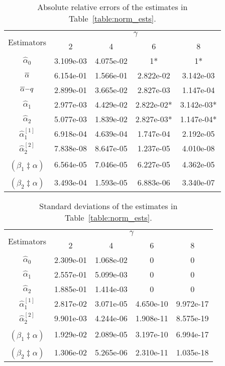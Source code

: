 \begin{table}[H]
\centering
\begin{tabular}{ccccc}
\toprule
\multirow{2}{*}{Estimators} & \multicolumn{4}{c}{$\gamma$} \\
                            & 2    & 4    & 6    & 8    \\
\midrule
$\hat{\alpha}_0$ & 3.109e-03 & 4.075e-02 & 1* & 1* \\
\rowcolor{Gray} $\overline{\alpha}$ & 6.154e-01 & 1.566e-01 & 2.822e-02 & 3.142e-03 \\
$\overline{\alpha}{-}q$ & 2.899e-01 & 3.665e-02 & 2.827e-03 & 1.147e-04 \\
\rowcolor{Gray} $\hat{\alpha}_1$ & 2.977e-03 & 4.429e-02 & 2.822e-02* & 3.142e-03* \\
$\hat{\alpha}_2$ & 5.077e-03 & 1.839e-02 & 2.827e-03* & 1.147e-04* \\
\rowcolor{Gray} $\hat{\alpha}_1^{[1]}$ & 6.918e-04 & 4.639e-04 & 1.747e-04 & 2.192e-05 \\
$\hat{\alpha}_2^{[2]}$ & 7.838e-08 & 8.647e-05 & 1.237e-05 & 4.010e-08 \\
\rowcolor{Gray} $\widehat{(\beta_1 \ddagger \alpha)}$ & 6.564e-05 & 7.046e-05 & 6.227e-05 & 4.362e-05 \\
$\widehat{(\beta_2 \ddagger \alpha)}$ & 3.493e-04 & 1.593e-05 & 6.883e-06 & 3.340e-07 \\
\bottomrule
\end{tabular}
\caption{Absolute relative errors of the estimates in Table~\ref{table:norm_ests}.}
\end{table}

\vspace{-2em}

\begin{table}[H]
\centering
\begin{tabular}{ccccc}
\toprule
\multirow{2}{*}{Estimators} & \multicolumn{4}{c}{$\gamma$} \\
                            & 2    & 4    & 6    & 8    \\
\midrule
$\hat{\alpha}_0$ & 2.309e-01 & 1.068e-02 & 0 & 0 \\
\rowcolor{Gray} $\hat{\alpha}_1$ & 2.557e-01 & 5.099e-03 & 0 & 0 \\
$\hat{\alpha}_2$ & 1.885e-01 & 1.414e-03 & 0 & 0 \\
\rowcolor{Gray} $\hat{\alpha}_1^{[1]}$ & 2.817e-02 & 3.071e-05 & 4.650e-10 & 9.972e-17 \\
$\hat{\alpha}_2^{[2]}$ & 9.901e-03 & 4.244e-06 & 1.908e-11 & 8.575e-19 \\
\rowcolor{Gray} $\widehat{(\beta_1 \ddagger \alpha)}$ & 1.929e-02 & 2.089e-05 & 3.197e-10 & 6.994e-17 \\
$\widehat{(\beta_2 \ddagger \alpha)}$ & 1.306e-02 & 5.265e-06 & 2.310e-11 & 1.035e-18 \\
\bottomrule
\end{tabular}
\caption{Standard deviations of the estimates in Table~\ref{table:norm_ests}.}
\end{table}



